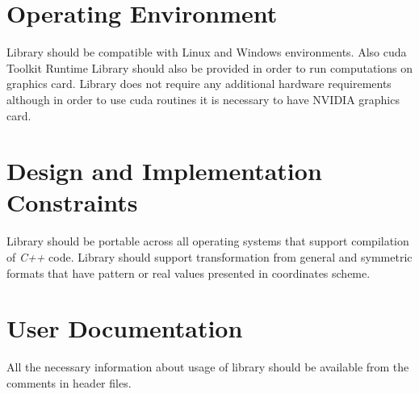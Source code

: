 \section{Operating Environment}

	{
		Library should be compatible with Linux and Windows environments. Also \gls{cuda} Toolkit Runtime Library should also be provided in order to run computations on graphics card.
	}\label{req:operating-enviornment:system-specification}
	{
		Library does not require any additional hardware requirements although in order to use \gls{cuda} routines it is necessary to have NVIDIA graphics card.
	}\label{req:operating-enviornment:hardware-specification}
\section{Design and Implementation Constraints}

	{ 
		Library should be portable across all operating systems that support compilation of \emph{C++} code.
	}
	{ 
		Library should support transformation from general and symmetric formats that have pattern or real values presented in coordinates scheme.
	}
\section{User Documentation}

	{
		All the necessary information about usage of library should be available from the comments in header files.   
	}
